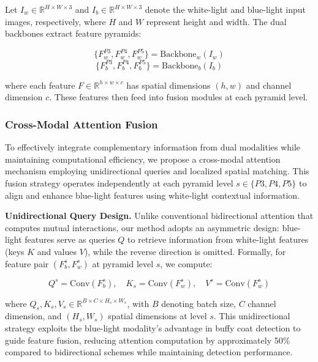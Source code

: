\documentclass[journal,twoside,web]{ieeecolor}
\begin{document}
Let $I_w \in \mathbb{R}^{H \times W \times 3}$ and $I_b \in \mathbb{R}^{H \times W \times 3}$ denote the white-light and blue-light input images, respectively, where $H$ and $W$ represent height and width. The dual backbones extract feature pyramids:

\begin{equation}
\{F_w^{P3}, F_w^{P4}, F_w^{P5}\} = \text{Backbone}_w(I_w)
\end{equation}
\begin{equation}
\{F_b^{P3}, F_b^{P4}, F_b^{P5}\} = \text{Backbone}_b(I_b)
\end{equation}

where each feature $F \in \mathbb{R}^{h \times w \times c}$ has spatial dimensions $(h, w)$ and channel dimension $c$. These features then feed into fusion modules at each pyramid level.

\subsubsection{Cross-Modal Attention Fusion}

To effectively integrate complementary information from dual modalities while maintaining computational efficiency, we propose a cross-modal attention mechanism employing unidirectional queries and localized spatial matching. This fusion strategy operates independently at each pyramid level $s \in \{P3, P4, P5\}$ to align and enhance blue-light features using white-light contextual information.

\textbf{Unidirectional Query Design.} Unlike conventional bidirectional attention that computes mutual interactions, our method adopts an asymmetric design: blue-light features serve as queries $Q$ to retrieve information from white-light features (keys $K$ and values $V$), while the reverse direction is omitted. Formally, for feature pair $(F_b^s, F_w^s)$ at pyramid level $s$, we compute:

\begin{equation}
Q^s = \text{Conv}(F_b^s), \quad K_s = \text{Conv}(F_w^s), \quad V^s = \text{Conv}(F_w^s)
\end{equation}

where $Q_s, K_s, V_s \in \mathbb{R}^{B \times C \times H_s \times W_s}$, with $B$ denoting batch size, $C$ channel dimension, and $(H_s, W_s)$ spatial dimensions at level $s$. This unidirectional strategy exploits the blue-light modality's advantage in buffy coat detection to guide feature fusion, reducing attention computation by approximately 50\% compared to bidirectional schemes while maintaining detection performance.
\end{document}
